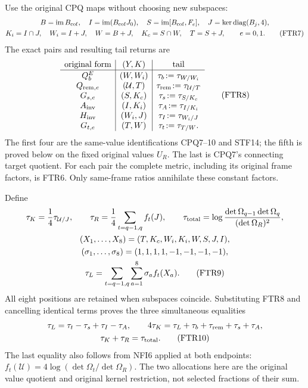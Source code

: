 \documentclass[11pt,a4paper]{article}
\begin{document}
Use the original CPQ maps without choosing new subspaces:
\[
\begin{gathered}
 B=\operatorname{im}B_{\rm cof},\quad
 I=\operatorname{im}(B_{\rm cof}J_0),\quad
 S=\operatorname{im}[B_{\rm cof},F_e],\quad
 J=\ker\operatorname{diag}(B_j,4),\\
 K_i=I\cap J,\quad W_i=I+J,\quad W=B+J,\quad
 K_c=S\cap W,\quad T=S+J,\qquad e=0,1 .                 \tag{FTR7}
\end{gathered}
\]
The exact pairs and resulting tail returns are
\[
\begin{array}{c|c|c}
 \text{original form}&(Y,K)&\text{tail}\\\hline
 Q_b^E&(W,W_i)&\tau_b\!:=\tau_{W/W_i}\rule{0pt}{2.2ex}\\
 Q_{{\rm rem},e}&(\mathcal U,T)&\tau_{\rm rem}\!:=\tau_{\mathcal U/T}\\
 G_{s,e}&(S,K_c)&\tau_s\!:=\tau_{S/K_c}\\
 A_{\rm inv}&(I,K_i)&\tau_A\!:=\tau_{I/K_i}\\
 H_{\rm inv}&(W_i,J)&\tau_I\!:=\tau_{W_i/J}\\
 G_{t,e}&(T,W)&\tau_t\!:=\tau_{T/W}.
\end{array}                                                    \tag{FTR8}
\]
The first four are the same-value identifications CPQ7--10 and
STF14; the fifth is proved below on the fixed original values
$U_R$. The last is CPQ7's connecting target quotient. For each
pair the complete metric, including its original frame factors,
is FTR6. Only same-frame ratios annihilate these constant factors.

Define
\[
\begin{gathered}
 \tau_K={1\over4}\tau_{\mathcal U/J},\qquad
 \tau_R={1\over4}\sum_{t=q-1,q}f_t(J),\qquad
 \tau_{\rm total}=\log
       {\det\Omega_{q-1}\det\Omega_q\over(\det\Omega_R)^2},\\
 (X_1,\ldots,X_8)=(T,K_c,W_i,K_i,W,S,J,I),\\
 (\sigma_1,\ldots,\sigma_8)=(1,1,1,1,-1,-1,-1,-1),\\
 \tau_L=\sum_{t=q-1,q}\sum_{a=1}^8\sigma_af_t(X_a).
                                                               \tag{FTR9}
\end{gathered}
\]
All eight positions are retained when subspaces coincide.
Substituting FTR8 and cancelling identical terms proves the
three simultaneous equalities
\[
\begin{gathered}
 \tau_L=\tau_t-\tau_s+\tau_I-\tau_A,\qquad
 4\tau_K=\tau_L+\tau_b+\tau_{\rm rem}+\tau_s+\tau_A,\\
 \tau_K+\tau_R=\tau_{\rm total}.                         \tag{FTR10}
\end{gathered}
\]
The last equality also follows from NFI6 applied at both endpoints:
$f_t(\mathcal U)=4\log(\det\Omega_t/\det\Omega_R)$.
The two allocations here are the original value quotient and
original kernel restriction, not selected fractions of their sum.
\end{document}
